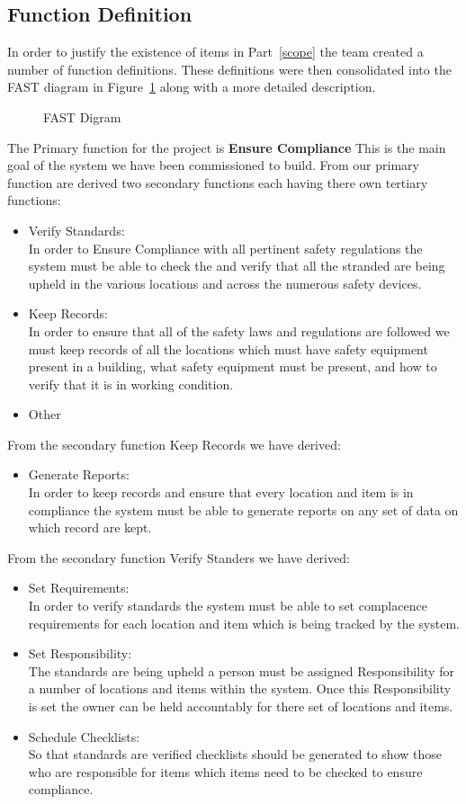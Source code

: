 \documentclass[Letter,11pt]{article}
\begin{document}
	\subsection{Function Definition} 
		In order to justify the existence of items in Part~\ref{scope} the team created a number of function definitions. These definitions were then consolidated into the FAST diagram in Figure~\ref{fast1} along with a more detailed description.
		\begin{figure}[h]
			\centering
			
			\caption{\label{fast1} FAST Digram}
		\end{figure}
		The Primary function for the project is \textbf{Ensure Compliance} This is the main goal of the system we have been commissioned to build. From our primary function are derived two secondary functions each having there own tertiary functions:
		\begin{itemize}
			\item Verify Standards:\\
			In order to Ensure Compliance with all pertinent safety regulations the system must be able to check the and verify that all the stranded are being upheld in the various locations and across the numerous safety devices.
			\item Keep Records:\\
			In order to ensure that all of the safety laws and regulations are followed we must keep records of all the locations which must have safety equipment present in a building, what safety equipment must be present, and how to verify that it is in working condition.  

			\item Other 
		\end{itemize}
		From the secondary function Keep Records we have derived: 
		\begin{itemize}
			\item Generate Reports:\\
			In order to keep records and ensure that every location and item is in compliance the system must be able to generate reports on any set of data on which record are kept. 
		\end{itemize}
		From the secondary function Verify Standers we have derived:
		\begin{itemize}
			\item Set Requirements:\\
			In order to verify standards the system must be able to set complacence requirements for each location and item which is being tracked by the system.
			\item Set Responsibility:\\
			The standards are being upheld a person must be assigned Responsibility for a number of locations and items within the system. Once this Responsibility is set the owner can be held accountably for there set of locations and items. 
			\item Schedule Checklists:\\
			So that standards are verified  checklists should be generated to show those who are responsible for items which items need to be checked to ensure compliance.
		\end{itemize}
		
\end{document}
